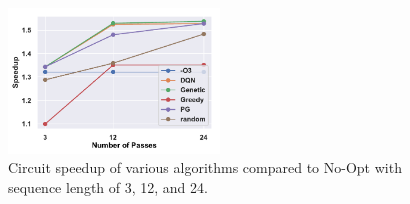 \begin{figure}[!t]
    \centering
    \includegraphics[width=0.5\textwidth]{Figures/length.pdf}
    \vspace{-0.7cm}
    \caption{Circuit speedup of various algorithms compared to No-Opt with sequence length of 3, 12, and 24.}
    \label{fig:length}
    \vspace{-0.5cm}
\end{figure}

